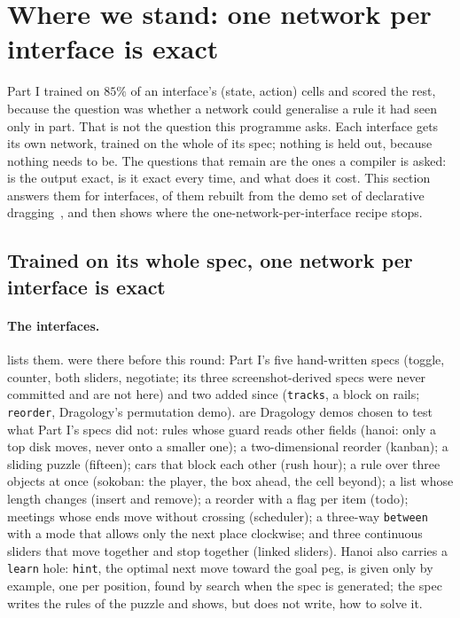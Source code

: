 \section{Where we stand: one network per interface is exact}
\label{sec:standing}

Part I trained on $85\%$ of an interface's (state, action) cells and scored the rest, because the question was
whether a network could generalise a rule it had seen only in part. That is not the question this programme
asks. Each interface gets its own network, trained on the whole of its spec; nothing is held out, because
nothing needs to be. The questions that remain are the ones a compiler is asked: is the output exact, is it
exact every time, and what does it cost. This section answers them for \nPlanned{} interfaces, \nNewDemos{} of them rebuilt
from the demo set of declarative dragging~\citep{dragology}, and then shows where the one-network-per-interface recipe stops.

\subsection{Trained on its whole spec, one network per interface is exact}
\label{sec:round2}

\paragraph{The interfaces.}  lists them. \nBefore{} were there before this round: Part I's
five hand-written specs (toggle, counter, both sliders, negotiate; its three screenshot-derived specs were never
committed and are not here) and two added since (\texttt{tracks}, a block on rails; \texttt{reorder},
Dragology's permutation demo). \nNewDemos{} are Dragology demos chosen to test what Part I's specs did not: rules whose guard reads other fields
(hanoi: only a top disk moves, never onto a smaller one); a two-dimensional reorder (kanban); a sliding puzzle
(fifteen); cars that block each other (rush hour); a rule over three objects at once (sokoban: the player, the
box ahead, the cell beyond); a list whose length changes (insert and remove); a reorder with a flag per item
(todo); meetings whose ends move without crossing (scheduler); a three-way \texttt{between} with a mode that
allows only the next place clockwise; and three continuous sliders that move together and stop together
(linked sliders). Hanoi also carries a \texttt{learn} hole: \texttt{hint}, the optimal next move toward the
goal peg, is given only by example, one per position, found by search when the spec is generated; the spec
writes the rules of the puzzle and shows, but does not write, how to solve it.

